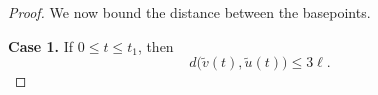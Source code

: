 \documentclass[a4paper,english,reqno]{amsart}
\newtheorem{lemma}{Lemma}
\theoremstyle{definition}
\numberwithin{equation}{section}
\begin{document}
\begin{proof}
% 	
% 	
% 	
 	
 	
 	We now bound the distance between the basepoints.
 	
 	\noindent\textbf{Case 1.}  If $0\le t\le t_1$, then 
 	\[
 	d\bigl(\tilde v(t),\tilde u(t)\bigr)\le 3\ell.
 	\] 


\end{proof}
\end{document}
